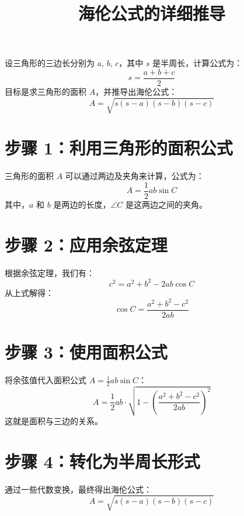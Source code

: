 \documentclass{article}
\begin{document}
\title{海伦公式的详细推导}
\author{}
\date{}
\maketitle

设三角形的三边长分别为 \( a \), \( b \), \( c \)，其中 \( s \) 是半周长，计算公式为：
\[
s = \frac{a + b + c}{2}
\]
目标是求三角形的面积 \( A \)，并推导出海伦公式：
\[
A = \sqrt{s(s-a)(s-b)(s-c)}
\]

\section*{步骤 1：利用三角形的面积公式}
三角形的面积 \( A \) 可以通过两边及夹角来计算，公式为：
\[
A = \frac{1}{2}ab \sin C
\]
其中，\( a \) 和 \( b \) 是两边的长度，\(\angle C\) 是这两边之间的夹角。

\section*{步骤 2：应用余弦定理}
根据余弦定理，我们有：
\[
c^2 = a^2 + b^2 - 2ab \cos C
\]
从上式解得：
\[
\cos C = \frac{a^2 + b^2 - c^2}{2ab}
\]

\section*{步骤 3：使用面积公式}
将余弦值代入面积公式 \( A = \frac{1}{2}ab \sin C \)：
\[
A = \frac{1}{2}ab \cdot \sqrt{1 - \left( \frac{a^2 + b^2 - c^2}{2ab} \right)^2}
\]
这就是面积与三边的关系。

\section*{步骤 4：转化为半周长形式}
通过一些代数变换，最终得出海伦公式：
\[
A = \sqrt{s(s-a)(s-b)(s-c)}
\]
\end{document}
